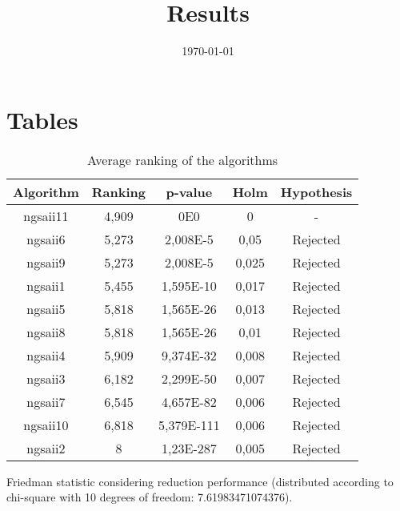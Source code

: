 \documentclass{article}
\title{Results}
\author{}
\date{\today}
\begin{document}
\oddsidemargin 0in \topmargin 0in\maketitle

\section{Tables}
\begin{table}[!htp]
\centering
\begin{tabular}{c|c|c|c|c}
Algorithm&Ranking&p-value&Holm&Hypothesis\\
\hline
ngsaii11 & 4,909 & 0E0 & 0 & -\\
ngsaii6 & 5,273 & 2,008E-5 & 0,05 & Rejected\\
ngsaii9 & 5,273 & 2,008E-5 & 0,025 & Rejected\\
ngsaii1 & 5,455 & 1,595E-10 & 0,017 & Rejected\\
ngsaii5 & 5,818 & 1,565E-26 & 0,013 & Rejected\\
ngsaii8 & 5,818 & 1,565E-26 & 0,01 & Rejected\\
ngsaii4 & 5,909 & 9,374E-32 & 0,008 & Rejected\\
ngsaii3 & 6,182 & 2,299E-50 & 0,007 & Rejected\\
ngsaii7 & 6,545 & 4,657E-82 & 0,006 & Rejected\\
ngsaii10 & 6,818 & 5,379E-111 & 0,006 & Rejected\\
ngsaii2 & 8 & 1,23E-287 & 0,005 & Rejected\\
\end{tabular}
\caption{Average ranking of the algorithms}
\end{table}


Friedman statistic considering reduction performance (distributed according to chi-square with 10 degrees of freedom: 7.61983471074376).
\end{document}
